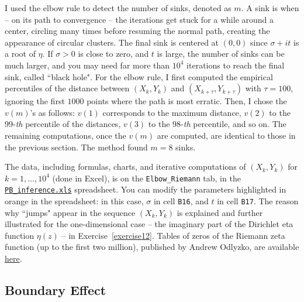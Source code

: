 \documentclass[10pt]{article}
\begin{document}
I used the elbow rule to detect the number of sinks, denoted as $m$. A sink is when -- on its path to convergence -- the iterations get stuck for a while around a center, circling many times before resuming the normal path, creating the appearance of circular clusters. The final sink is centered at $(0,0)$ since $\sigma+it$ is a root of $\eta$. 
If $\sigma>0$ is close to zero, and $t$ is large, the number of sinks can be much larger, and you may need far more than $10^4$ iterations to reach the final sink, called ``black hole".
For the elbow rule, I first computed the empirical percentiles of the distance between
$(X_k, Y_k)$ and $(X_{k+\tau}, Y_{k+\tau})$ with $\tau=100$, ignoring the first $\num{1000}$ points where the path is most erratic. Then, I chose the $v(m)$'s as follows: $v(1)$ corresponds to the maximum distance, $v(2)$ to the 99-{\em th} percentile of the distances, $v(3)$ to the 98-{\em th} percentile, and so on. The remaining computations, once the $v(m)$ are computed, are identical to those in the previous section. The method found $m=8$ sinks.

The data, including formulas, charts, and iterative computations of $(X_k,Y_k)$ for $k=1,\dots,10^4$ (done in Excel), is on the 
\texttt{Elbow\_Riemann} tab,
in the \href{https://github.com/VincentGranville/Point-Processes/tree/main/Spreadsheets}{\texttt{PB\_inference.xls}} spreadsheet. You can modify the parameters highlighted in orange in the spreadsheet: in this case, $\sigma$ in cell 
\texttt{B16}, and $t$ in cell \texttt{B17}. The reason why ``jumps" appear in the sequence $(X_k,Y_k)$ is explained and further illustrated for the one-dimensional
case -- the imaginary part of the Dirichlet eta function $\eta(z)$ -- in Exercise~\ref{exercise12}.
Tables of zeros of the Riemann zeta function (up to the first two million), published by Andrew Odlyzko, are available \href{http://www.dtc.umn.edu/~odlyzko/zeta_tables/index.html}{here}.


\subsection{Boundary Effect}\label{boundary}
\end{document}
